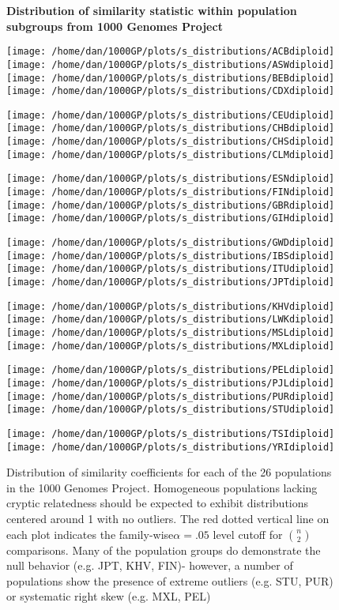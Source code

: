 \documentclass[english]{article}
\begin{document}
\begin{figure}
\textbf{Distribution of similarity statistic within population subgroups
from 1000 Genomes Project }

\texttt{[image: /home/dan/1000GP/plots/s\_distributions/ACBdiploid]}\texttt{[image: /home/dan/1000GP/plots/s\_distributions/ASWdiploid]}\texttt{[image: /home/dan/1000GP/plots/s\_distributions/BEBdiploid]}\texttt{[image: /home/dan/1000GP/plots/s\_distributions/CDXdiploid]}

\texttt{[image: /home/dan/1000GP/plots/s\_distributions/CEUdiploid]}\texttt{[image: /home/dan/1000GP/plots/s\_distributions/CHBdiploid]}\texttt{[image: /home/dan/1000GP/plots/s\_distributions/CHSdiploid]}\texttt{[image: /home/dan/1000GP/plots/s\_distributions/CLMdiploid]}

\texttt{[image: /home/dan/1000GP/plots/s\_distributions/ESNdiploid]}\texttt{[image: /home/dan/1000GP/plots/s\_distributions/FINdiploid]}\texttt{[image: /home/dan/1000GP/plots/s\_distributions/GBRdiploid]}\texttt{[image: /home/dan/1000GP/plots/s\_distributions/GIHdiploid]}

\texttt{[image: /home/dan/1000GP/plots/s\_distributions/GWDdiploid]}\texttt{[image: /home/dan/1000GP/plots/s\_distributions/IBSdiploid]}\texttt{[image: /home/dan/1000GP/plots/s\_distributions/ITUdiploid]}\texttt{[image: /home/dan/1000GP/plots/s\_distributions/JPTdiploid]}

\texttt{[image: /home/dan/1000GP/plots/s\_distributions/KHVdiploid]}\texttt{[image: /home/dan/1000GP/plots/s\_distributions/LWKdiploid]}\texttt{[image: /home/dan/1000GP/plots/s\_distributions/MSLdiploid]}\texttt{[image: /home/dan/1000GP/plots/s\_distributions/MXLdiploid]}

\texttt{[image: /home/dan/1000GP/plots/s\_distributions/PELdiploid]}\texttt{[image: /home/dan/1000GP/plots/s\_distributions/PJLdiploid]}\texttt{[image: /home/dan/1000GP/plots/s\_distributions/PURdiploid]}\texttt{[image: /home/dan/1000GP/plots/s\_distributions/STUdiploid]}

\texttt{[image: /home/dan/1000GP/plots/s\_distributions/TSIdiploid]}\texttt{[image: /home/dan/1000GP/plots/s\_distributions/YRIdiploid]}\caption{Distribution of similarity coefficients for each of the 26 populations
in the 1000 Genomes Project. Homogeneous populations lacking cryptic
relatedness should be expected to exhibit distributions centered around
1 with no outliers. The red dotted vertical line on each plot indicates
the family-wise$\alpha=.05$ level cutoff for ${n \choose 2}$ comparisons.
Many of the population groups do demonstrate the null behavior (e.g.
JPT, KHV, FIN)- however, a number of populations show the presence
of extreme outliers (e.g. STU, PUR) or systematic right skew (e.g.
MXL, PEL)}
\end{figure}
\end{document}
